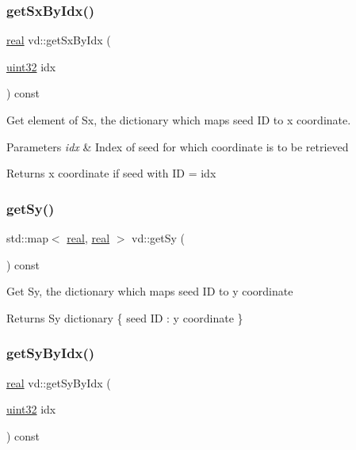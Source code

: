 \subsubsection{\texorpdfstring{get\+Sx\+By\+Idx()}{getSxByIdx()}}
{\footnotesize\ttfamily \mbox{\hyperlink{typedefs_8cpp_a58a0c7cf2501f4492da833421be92547}{real}} vd\+::get\+Sx\+By\+Idx (\begin{DoxyParamCaption}\item[{\mbox{\hyperlink{typedefs_8cpp_a8ad23e2333787a214e20a58a284a5a60}{uint32}}}]{idx }\end{DoxyParamCaption}) const}

Get element of Sx, the dictionary which maps seed ID to x coordinate. 
\begin{DoxyParams}{Parameters}
{\em idx} & Index of seed for which coordinate is to be retrieved \\
\hline
\end{DoxyParams}
\begin{DoxyReturn}{Returns}
x coordinate if seed with ID = idx 
\end{DoxyReturn}
\mbox{\label{classvd_a13a2a103b632b3acf41b925b5b31449e}} 
\subsubsection{\texorpdfstring{get\+Sy()}{getSy()}}
{\footnotesize\ttfamily std\+::map$<$ \mbox{\hyperlink{typedefs_8cpp_a58a0c7cf2501f4492da833421be92547}{real}}, \mbox{\hyperlink{typedefs_8cpp_a58a0c7cf2501f4492da833421be92547}{real}} $>$ vd\+::get\+Sy (\begin{DoxyParamCaption}{ }\end{DoxyParamCaption}) const}

Get Sy, the dictionary which maps seed ID to y coordinate \begin{DoxyReturn}{Returns}
Sy dictionary \{ seed ID \+: y coordinate \} 
\end{DoxyReturn}
\mbox{\label{classvd_a0f630fc80e57d3e17ab036f75afde006}} 
\subsubsection{\texorpdfstring{get\+Sy\+By\+Idx()}{getSyByIdx()}}
{\footnotesize\ttfamily \mbox{\hyperlink{typedefs_8cpp_a58a0c7cf2501f4492da833421be92547}{real}} vd\+::get\+Sy\+By\+Idx (\begin{DoxyParamCaption}\item[{\mbox{\hyperlink{typedefs_8cpp_a8ad23e2333787a214e20a58a284a5a60}{uint32}}}]{idx }\end{DoxyParamCaption}) const}

